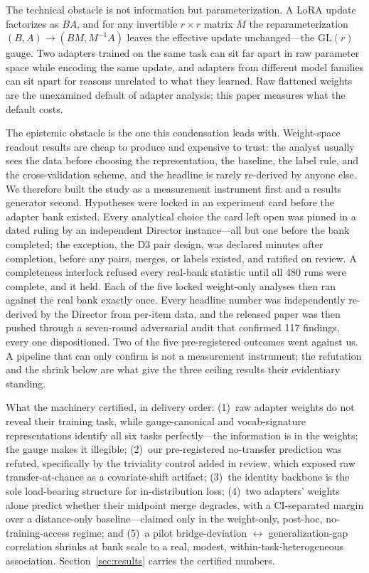 \documentclass[10pt]{article}
\begin{document}
The technical obstacle is not information but parameterization. A LoRA
update factorizes as $BA$, and for any invertible $r \times r$ matrix $M$
the reparameterization $(B, A) \rightarrow (BM, M^{-1}A)$ leaves the
effective update unchanged---the $\mathrm{GL}(r)$ gauge. Two adapters
trained on the same task can sit far apart in raw parameter space while
encoding the same update, and adapters from different model families can
sit apart for reasons unrelated to what they learned. Raw flattened weights
are the unexamined default of adapter analysis; this paper measures what
the default costs.

The epistemic obstacle is the one this condensation leads with. Weight-space
readout results are cheap to produce and expensive to trust: the analyst
usually sees the data before choosing the representation, the baseline, the
label rule, and the cross-validation scheme, and the headline is rarely
re-derived by anyone else. We therefore built the study as a measurement
instrument first and a results generator second. Hypotheses were locked in
an experiment card before the adapter bank existed. Every analytical choice
the card left open was pinned in a dated ruling by an independent Director
instance---all but one before the bank completed; the exception, the D3
pair design, was declared minutes after completion, before any pairs,
merges, or labels existed, and ratified on review. A completeness interlock
refused every real-bank statistic until all 480 runs were complete, and it
held. Each of the five locked weight-only analyses then ran against the
real bank exactly once. Every headline number was independently re-derived
by the Director from per-item data, and the released paper was then pushed
through a seven-round adversarial audit that confirmed 117 findings, every
one dispositioned. Two of the five pre-registered outcomes went against
us. A pipeline that can only confirm is not a measurement instrument; the
refutation and the shrink below are what give the three ceiling results
their evidentiary standing.

What the machinery certified, in delivery order: (1)~raw adapter weights
do not reveal their training task, while gauge-canonical and
vocab-signature representations identify all six tasks perfectly---the
information is in the weights; the gauge makes it illegible;
(2)~our pre-registered no-transfer prediction was refuted, specifically
by the triviality control added in review, which exposed raw
transfer-at-chance as a covariate-shift artifact; (3)~the identity
backbone is the sole load-bearing structure for in-distribution loss;
(4)~two adapters' weights alone predict whether their midpoint merge
degrades, with a CI-separated margin over a distance-only
baseline---claimed only in the weight-only, post-hoc, no-training-access
regime; and (5)~a pilot bridge-deviation $\leftrightarrow$
generalization-gap correlation shrinks at bank scale to a real, modest,
within-task-heterogeneous association. Section~\ref{sec:results} carries
the certified numbers.
\end{document}
